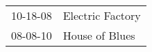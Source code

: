 \begin{supertabular}{p{0.25\columnwidth}p{0.75\columnwidth}}
 10-18-08 &  Electric Factory \\
 08-08-10 &    House of Blues \\
\end{supertabular}

